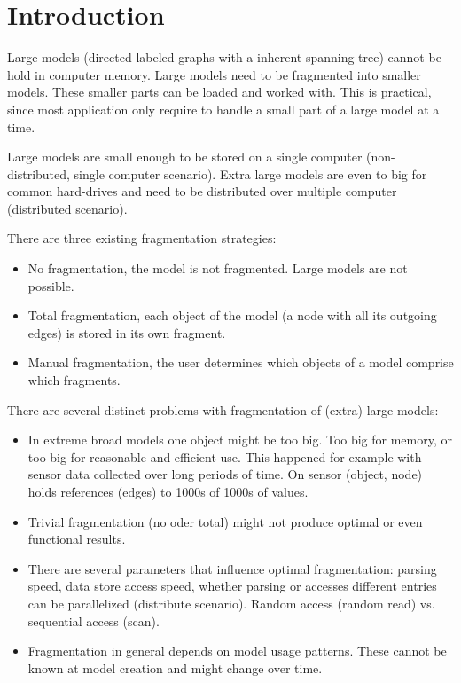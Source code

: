 \section{Introduction}

Large models (directed labeled graphs with a inherent spanning tree) cannot be hold in computer memory. Large models need to be fragmented into smaller models. These smaller parts can be loaded and worked with. This is practical, since most application only require to handle a small part of a large model at a time. 

Large models are small enough to be stored on a single computer (non-distributed, single computer scenario). Extra large models are even to big for common hard-drives and need to be distributed over multiple computer (distributed scenario).

There are three existing fragmentation strategies:
\begin{itemize}

\item No fragmentation, the model is not fragmented. Large models are not possible.
\item Total fragmentation, each object of the model (a node with all its outgoing edges) is stored in its own fragment.
\item Manual fragmentation, the user determines which objects of a model comprise which fragments.
\end{itemize} 

There are several distinct problems with fragmentation of (extra) large models:
\begin{itemize}

\item In extreme broad models one object might be too big. Too big for memory, or too big for reasonable and efficient use. This happened for example with sensor data collected over long periods of time. On sensor (object, node) holds references (edges) to 1000s of 1000s of values.  

\item Trivial fragmentation (no oder total) might not produce optimal or even functional results. 

\item There are several parameters that influence optimal fragmentation: parsing speed, data store access speed, whether parsing or accesses different entries can be parallelized (distribute scenario). Random access (random read) vs. sequential access (scan). 

\item Fragmentation in general depends on model usage patterns. These cannot be known at model creation and might change over time.
\end{itemize}


